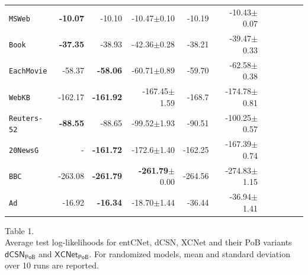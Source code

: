 \documentclass[xcolor={usenames,dvipsnames,svgnames}, compress]{beamer}
\begin{document}
\begin{frame}[t]
\begin{table}[t]
\begin{tabular}{l rrrrrrrrrr}
    \texttt{MSWeb}        &\textbf{-10.07}&\cellcolor{gold2}\color{white}-10.10&\cellcolor{gold2}\color{white}-10.47$\pm$0.10&-10.19&-10.43$\pm$0.07\\
    \texttt{Book}         &\textbf{-37.35}&-38.93&-42.36$\pm$0.28&-38.21&-39.47$\pm$0.33\\
    \texttt{EachMovie}    &-58.37&\textbf{-58.06}&-60.71$\pm$0.89&-59.70&-62.58$\pm$0.38\\
    \texttt{WebKB}        &-162.17&\textbf{-161.92}&-167.45$\pm$1.59&-168.7&-174.78$\pm$0.81\\
    \texttt{Reuters-52}   &\textbf{-88.55}&-88.65&-99.52$\pm$1.93&-90.51&-100.25$\pm$0.57\\
    \texttt{20NewsG} & - &\textbf{-161.72}&-172.6$\pm$1.40&-162.25&-167.39$\pm$0.74\\
    \texttt{BBC}          &-263.08&\cellcolor{gold2}\color{white}\textbf{-261.79}&\cellcolor{gold2}\color{white}\textbf{-261.79}$\pm$0.00&-264.56&-274.83$\pm$1.15\\
    \texttt{Ad}           &-16.92&\textbf{-16.34}&-18.70$\pm$1.44&-36.44&-36.94$\pm$1.41\\
    \bottomrule
  \end{tabular}
  \label{tab:ll-sing}
\end{table}\vspace{-10pt}\hspace{35pt}
\begin{minipage}{0.8\linewidth}
  \tiny
  \flushleft
  Table 1.\\
  Average test log-likelihoods for 
  \textsf{entCNet}, \textsf{dCSN}, \textsf{XCNet} and their
  \textsf{PoB} variants $\mathsf{dCSN_{PoB}}$ and $\mathsf{XCNet_{PoB}}$.
    For randomized models, mean and standard deviation over 10 runs are reported.
\end{minipage}
\end{frame}
\end{document}
